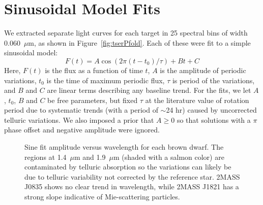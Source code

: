 \documentclass[twocolumn]{aastex6}
\begin{document}
\section{Sinusoidal Model Fits}\label{sec:ModelFits}

We extracted separate light curves for each target in 25 spectral bins of width 0.060~$\mu$m, as shown in Figure~\ref{fig:tserPfold}. Each of these were fit to a simple sinusoidal model:
\begin{equation}\label{eq:cosfit}
F(t) = A \cos(2 \pi (t - t_0)/\tau) + B t + C
\end{equation}
Here, $F(t)$ is the flux as a function of time $t$, $A$ is the amplitude of periodic variations, $t_0$ is the time of maximum periodic flux, $\tau$ is period of the variations, and $B$ and $C$ are linear terms describing any baseline trend.
For the fits, we let $A$, $t_0$, $B$ and $C$ be free parameters, but fixed $\tau$ at the literature value of rotation period due to systematic trends (with a period of $\sim$24 hr) caused by uncorrected telluric variations.
We also imposed a prior that $A \geq 0$ so that solutions with a $\pi$ phase offset and negative amplitude were ignored.

\begin{figure}
\centering
{}
	\caption{Sine fit amplitude versus wavelength for each brown dwarf. The regions at 1.4~$\mu$m and 1.9~$\mu$m (shaded with a salmon color) are contaminated by telluric absorption so the variations can likely be due to telluric variability not corrected by the reference star. 2MASS J0835 shows no clear trend in wavelength, while 2MASS J1821 has a strong slope indicative of Mie-scattering particles.}
	\label{fig:ampSpec}
\end{figure} 
\end{document}
